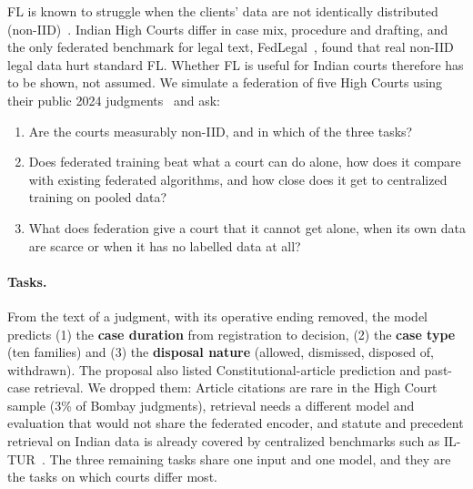 \documentclass[11pt,a4paper]{article}
\begin{document}
FL is known to struggle when the clients' data are not identically distributed
(non-IID)~\cite{li2020federated,kairouz2021advances}. Indian High Courts differ in case mix,
procedure and drafting, and the only federated benchmark for legal text, FedLegal~\cite{zhang2023fedlegal},
found that real non-IID legal data hurt standard FL. Whether FL is useful for Indian courts therefore
has to be shown, not assumed. We simulate a federation of five High Courts using their public 2024
judgments~\cite{dattam_hc} and ask:
\begin{enumerate}[label=\textbf{RQ\arabic*}]
  \item Are the courts measurably non-IID, and in which of the three tasks?
  \item Does federated training beat what a court can do alone, how does it compare with existing
        federated algorithms, and how close does it get to centralized training on pooled data?
  \item What does federation give a court that it cannot get alone, when its own data are scarce or
        when it has no labelled data at all?
\end{enumerate}

\paragraph{Tasks.} From the text of a judgment, with its operative ending removed, the model predicts
(1) the \textbf{case duration} from registration to decision, (2) the \textbf{case type} (ten
families) and (3) the \textbf{disposal nature} (allowed, dismissed, disposed of, withdrawn). The
proposal also listed Constitutional-article prediction and past-case retrieval. We dropped them:
Article citations are rare in the High Court sample (3\% of Bombay judgments), retrieval needs a
different model and evaluation that would not share the federated encoder, and statute and precedent
retrieval on Indian data is already covered by centralized benchmarks such as IL-TUR~\cite{joshi2024iltur}.
The three remaining tasks share one input and one model, and they are the tasks on which courts differ
most.
\end{document}
